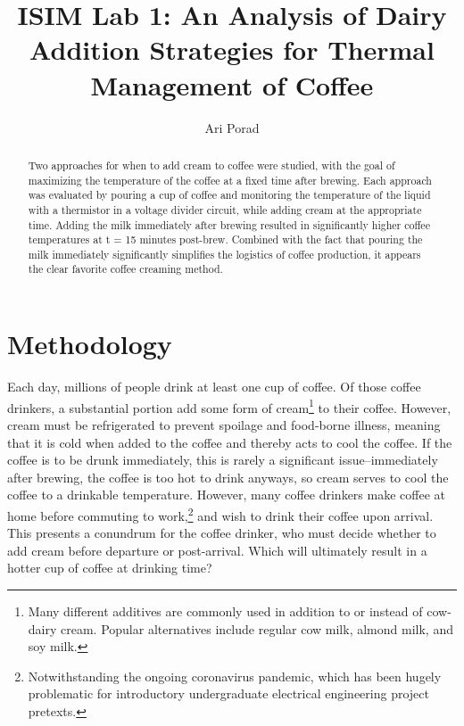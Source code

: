 \documentclass[11pt]{article}
\begin{document}
\title{ISIM Lab 1: An Analysis of Dairy Addition Strategies for Thermal Management of Coffee}
\author{Ari Porad}
\maketitle %

\begin{abstract}
    Two approaches for when to add cream to coffee were studied, with the goal of maximizing the temperature of the coffee at a fixed time after brewing. Each approach was evaluated by pouring a cup of coffee and monitoring the temperature of the liquid with a thermistor in a voltage divider circuit, while adding cream at the appropriate time. Adding the milk immediately after brewing resulted in significantly higher coffee temperatures at t = 15 minutes post-brew. Combined with the fact that pouring the milk immediately significantly simplifies the logistics of coffee production, it appears the clear favorite coffee creaming method.
\end{abstract}

\section{Methodology}

Each day, millions of people drink at least one cup of coffee. Of those coffee drinkers, a substantial portion add some form of cream\footnote{Many different additives are commonly used in addition to or instead of cow-dairy cream. Popular alternatives include regular cow milk, almond milk, and soy milk.} to their coffee. However, cream must be refrigerated to prevent spoilage and food-borne illness, meaning that it is cold when added to the coffee and thereby acts to cool the coffee. If the coffee is to be drunk immediately, this is rarely a significant issue--immediately after brewing, the coffee is too hot to drink anyways, so cream serves to cool the coffee to a drinkable temperature. However, many coffee drinkers make coffee at home before commuting to work,\footnote{Notwithstanding the ongoing coronavirus pandemic, which has been hugely problematic for introductory undergraduate electrical engineering project pretexts.} and wish to drink their coffee upon arrival. This presents a conundrum for the coffee drinker, who must decide whether to add cream before departure or post-arrival. Which will ultimately result in a hotter cup of coffee at drinking time?
\end{document}
